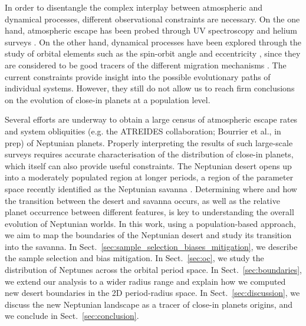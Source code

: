 \documentclass[]{aa}
\begin{document}
In order to disentangle the complex interplay between atmospheric and dynamical processes, different observational constraints are necessary. On the one hand, atmospheric escape has been probed through UV spectroscopy \citep[e.g.][]{2015Natur.522..459E,2017A&A...605L...7L,2018A&A...620A.147B} and helium surveys \citep{2018Sci...362.1388N,2018ApJ...855L..11O,2018Natur.557...68S,2018Sci...362.1384A,2023A&A...676A.130G}. On the other hand, dynamical processes have been explored through the study of orbital elements such as the spin-orbit angle \citep[e.g.][]{2018haex.bookE...2T,2018Natur.553..477B,2021A&A...654A.152B,2023A&A...674A.120A} and eccentricity \citep{2020A&A...635A..37C}, since they are considered to be good tracers of the different migration mechanisms \citep[e.g.][]{2012ApJ...754L..36N,2012ApJ...757...18A,2020A&A...643A..25P,2020AJ....160..179M}. The current constraints provide insight into the possible evolutionary paths of individual systems. However, they still do not allow us to reach firm conclusions on the evolution of close-in planets at a population level. 

Several efforts are underway to obtain a large census of atmospheric escape rates \citep[e.g. the NIGHT spectrograph;][]{2024MNRAS.527.4467F} and system obliquities (e.g. the ATREIDES collaboration; Bourrier et al., in prep) of Neptunian planets. Properly interpreting the results of such large-scale surveys requires accurate characterisation of the distribution of close-in planets, which itself can also provide useful constraints. The Neptunian desert opens up into a moderately populated region at longer periods, a region of the parameter space recently identified as the Neptunian savanna \citep{2023A&A...669A..63B}. Determining where and how the transition between the desert and savanna occurs, as well as the relative planet occurrence between different features, is key to understanding the overall evolution of Neptunian worlds. In this work, using a population-based approach, we aim to map the boundaries of the Neptunian desert and study its transition into the savanna. In Sect.~\ref{sec:sample_selection_biases_mitigation}, we describe the sample selection and bias mitigation. In Sect.~\ref{sec:oc}, we study the distribution of Neptunes across the orbital period space. In Sect.~\ref{sec:boundaries}, we extend our analysis to a wider radius range and explain how we computed new desert boundaries in the 2D period-radius space. In Sect.~\ref{sec:discussion}, we discuss the new Neptunian landscape as a tracer of close-in planets origins, and we conclude in Sect.~\ref{sec:conclusion}.
\end{document}
